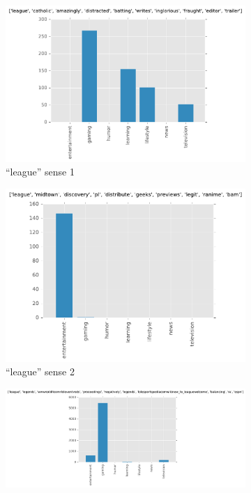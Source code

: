 \begin{landscape}
\begin{figure}[H]
\begin{subfigure}[t]{.3\textwidth}
\centering\includegraphics[]{figures/reddit-league-0.pdf}
\caption{``league'' sense 1}
\label{fig-reddit-league-0}
\end{subfigure}
\begin{subfigure}[t]{.3\textwidth}
\centering\includegraphics[]{figures/reddit-league-1.pdf}
\caption{``league'' sense 2}
\label{fig-reddit-league-1}
\end{subfigure}
\begin{subfigure}[t]{.3\textwidth}
\centering\includegraphics[]{figures/reddit-league-2.pdf}

\end{subfigure}
\end{figure}
\end{landscape}
